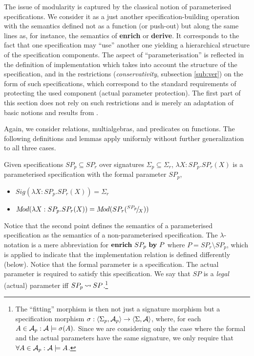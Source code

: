 The issue of modularity is captured by the classical notion of parameterised specifications.
We consider it as
a just another specification-building operation with the semantics defined not as a function (or push-out) but along the same lines as, for instance, the semantics of {\bf enrich} or {\bf derive}. It corresponds to the fact that
one specification may ``use'' another one yielding a hierarchical structure of the specification components. The aspect of ``parameterisation'' is reflected in the definition of implementation which takes into account the structure of the specification, and in the restrictions ({\em conservativity},
subsection \ref{sub:ver}) on the form of such specifications, which correspond to the standard requirements of protecting the used component (actual parameter protection). The first part of this section does not rely on such restrictions and is merely an adaptation of basic notions and results from \cite{ST}.

Again, we consider relations, multialgebras, and predicates on functions. 
The following definitions and lemmas
apply uniformly without further generalization to all three cases. 

\begin{DEFINITION}\label{de:param}
Given specifications $SP_p\subseteq SP_r$ over signatures $\Sigma_p\subseteq\Sigma_r$,
$\lambda X:SP_p.SP_r(X)$ is a parameterised specification with the formal parameter $SP_p$,
\begin{itemize}\MyLPar
\item $Sig(\lambda X:SP_p.SP_r(X)) = \Sigma_r$ \item $M\!od(\lambda X:SP_p.SP_r(X)) = M\!od(SP_r(^{SP_p}\!/\!_X))$ \end{itemize}
\end{DEFINITION}
\noindent Notice that the second point defines the semantics of a parameterised
specification as the semantics of a non-parameterised specification. The $\lambda$-notation is a mere abbreviation 
for ${\bf enrich\ }SP_p\ {\bf by}\ P$ where $P=SP_r\setminus SP_p$, which is applied to indicate that the implementation relation is defined differently (below). 
Notice that the formal parameter is a specification. The actual parameter is required to satisfy this specification. We say that $SP$ is a {\em legal} (actual) parameter iff $SP_p\mathbin{\leadsto} SP$.\footnote{The ``fitting'' morphism is then not just a signature morphism
but a specification morphism $\sigma:\langle\Sigma_p,{\cal A}_p\rangle\rightarrow \langle\Sigma,{\cal A}\rangle$, where, for each $A\in{\cal A}_p : {\cal A}\models\sigma(A).$ Since we are considering only the case where the formal and the actual parameters have the same signature, we only require that $\forall A\in{\cal A}_p : {\cal A}\models A$.} 

